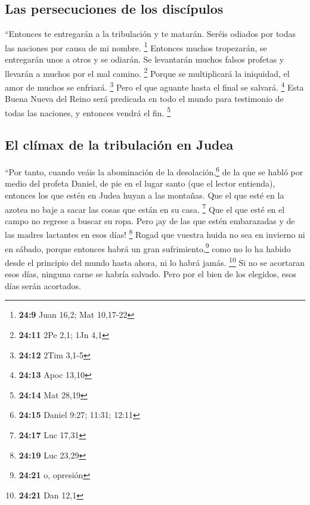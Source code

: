 \begin{paracol}{2}
\hypertarget{las-persecuciones-de-los-discuxedpulos}{%
\subsection{Las persecuciones de los
discípulos}\label{las-persecuciones-de-los-discuxedpulos}}

 ``Entonces te entregarán a la tribulación y te matarán.
Seréis odiados por todas las naciones por causa de mi nombre.
\footnote{\textbf{24:9} Juan 16,2; Mat 10,17-22} 
Entonces muchos tropezarán, se entregarán unos a otros y se odiarán.
 Se levantarán muchos falsos profetas y llevarán a muchos
por el mal camino. \footnote{\textbf{24:11} 2Pe 2,1; 1Jn 4,1}
 Porque se multiplicará la iniquidad, el amor de muchos
se enfriará. \footnote{\textbf{24:12} 2Tim 3,1-5}  Pero
el que aguante hasta el final se salvará. \footnote{\textbf{24:13} Apoc
  13,10}  Esta Buena Nueva del Reino será predicada en
todo el mundo para testimonio de todas las naciones, y entonces vendrá
el fin. \footnote{\textbf{24:14} Mat 28,19}

\hypertarget{el-cluxedmax-de-la-tribulaciuxf3n-en-judea}{%
\subsection{El clímax de la tribulación en
Judea}\label{el-cluxedmax-de-la-tribulaciuxf3n-en-judea}}

 ``Por tanto, cuando veáis la abominación de la
desolación,\footnote{\textbf{24:15} Daniel 9:27; 11:31; 12:11} de la que
se habló por medio del profeta Daniel, de pie en el lugar santo (que el
lector entienda),  entonces los que estén en Judea huyan
a las montañas.  Que el que esté en la azotea no baje a
sacar las cosas que están en su casa. \footnote{\textbf{24:17} Luc 17,31}
 Que el que esté en el campo no regrese a buscar su ropa.
 Pero ¡ay de las que estén embarazadas y de las madres
lactantes en esos días! \footnote{\textbf{24:19} Luc 23,29}
 Rogad que vuestra huida no sea en invierno ni en sábado,
 porque entonces habrá un gran sufrimiento,\footnote{\textbf{24:21}
  o, opresión} como no lo ha habido desde el principio del mundo hasta
ahora, ni lo habrá jamás. \footnote{\textbf{24:21} Dan 12,1}
 Si no se acortaran esos días, ninguna carne se habría
salvado. Pero por el bien de los elegidos, esos días serán acortados.


\end{paracol}
